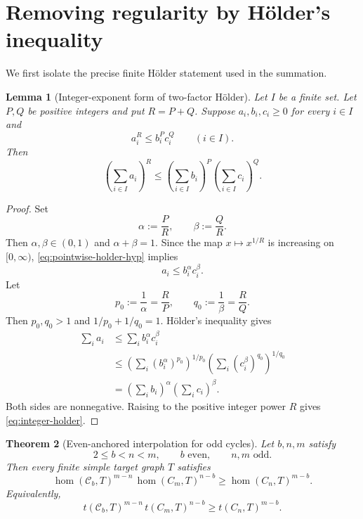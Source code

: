 \documentclass[11pt]{article}
\newtheorem{theorem}{Theorem}[section]
\newtheorem{lemma}[theorem]{Lemma}
\newcommand{\homn}{\operatorname{hom}}
\newcommand{\1}{\mathbf{1}}
\newcommand{\Ct}{\mathcal{C}}
\begin{document}
\section{Removing regularity by H\"older's inequality}

We first isolate the precise finite H\"older statement used in the summation.

\begin{lemma}[Integer-exponent form of two-factor H\"older]
\label{lem:integer-holder}
Let $I$ be a finite set.  Let $P,Q$ be positive integers and put $R=P+Q$.
Suppose $a_i,b_i,c_i\ge0$ for every $i\in I$ and
\[
  a_i^R\le b_i^P c_i^Q
  \qquad(i\in I).
  \tag{5.1}\label{eq:pointwise-holder-hyp}
\]
Then
\[
  \left(\sum_{i\in I}a_i\right)^R
  \le
  \left(\sum_{i\in I}b_i\right)^P
  \left(\sum_{i\in I}c_i\right)^Q.
  \tag{5.2}\label{eq:integer-holder}
\]
\end{lemma}

\begin{proof}
Set
\[
  \alpha:=\frac{P}{R},
  \qquad
  \beta:=\frac{Q}{R}.
\]
Then $\alpha,\beta\in(0,1)$ and $\alpha+\beta=1$.  Since the map
$x\mapsto x^{1/R}$ is increasing on $[0,\infty)$,
\eqref{eq:pointwise-holder-hyp} implies
\[
  a_i\le b_i^\alpha c_i^\beta.
\]
Let
\[
  p_0:=\frac{1}{\alpha}=\frac{R}{P},
  \qquad
  q_0:=\frac{1}{\beta}=\frac{R}{Q}.
\]
Then $p_0,q_0>1$ and $1/p_0+1/q_0=1$.  H\"older's inequality gives
\[
\begin{aligned}
  \sum_i a_i
  &\le \sum_i b_i^\alpha c_i^\beta\\
  &\le
  \left(\sum_i(b_i^\alpha)^{p_0}\right)^{1/p_0}
  \left(\sum_i(c_i^\beta)^{q_0}\right)^{1/q_0}\\
  &=
  \left(\sum_i b_i\right)^\alpha
  \left(\sum_i c_i\right)^\beta.
\end{aligned}
\]
Both sides are nonnegative.  Raising to the positive integer power $R$ gives
\eqref{eq:integer-holder}.
\end{proof}

\begin{theorem}[Even-anchored interpolation for odd cycles]
\label{thm:cycle-interpolation}
Let $b,n,m$ satisfy
\[
  2\le b<n<m,
  \qquad
  b\text{ even},
  \qquad
  n,m\text{ odd}.
\]
Then every finite simple target graph $T$ satisfies
\[
  \homn(\Ct_b,T)^{m-n}\,
  \homn(C_m,T)^{n-b}
  \ge
  \homn(C_n,T)^{m-b}.
  \tag{5.3}\label{eq:main-hom}
\]
Equivalently,
\[
  t(\Ct_b,T)^{m-n}\,
  t(C_m,T)^{n-b}
  \ge
  t(C_n,T)^{m-b}.
  \tag{5.4}\label{eq:main-density}
\]
\end{theorem}
\end{document}
